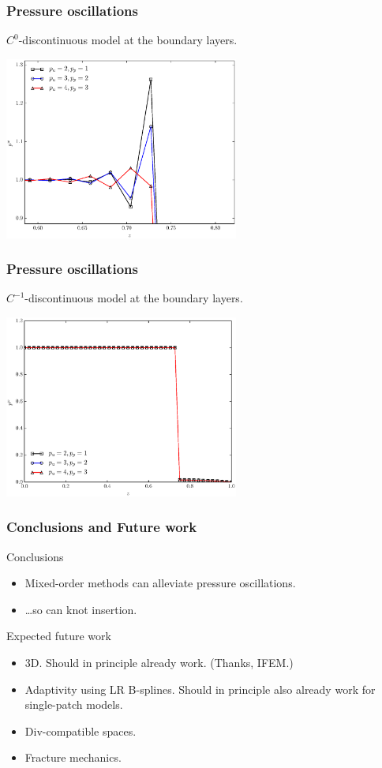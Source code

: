 \documentclass{beamer}
\begin{document}
\begin{frame}
  \frametitle{Pressure oscillations}

  $C^0$-discontinuous model at the boundary layers.
  \begin{center}
    \includegraphics[height=6cm]{figs/LowPermLayer_pw-z_plot6}
  \end{center}
\end{frame}

\begin{frame}
  \frametitle{Pressure oscillations}

  $C^{-1}$-discontinuous model at the boundary layers.
  \begin{center}
    \includegraphics[height=6cm]{figs/LowPermLayer_pw-z_plot8}
  \end{center}
\end{frame}

\begin{frame}
  \frametitle{Conclusions and Future work}

  Conclusions
  \begin{itemize}
  \item Mixed-order methods can alleviate pressure oscillations.
  \item \ldots so can knot insertion.
  \end{itemize}

  Expected future work
  \begin{itemize}
  \item 3D. Should in principle already work. (Thanks, IFEM.)
  \item Adaptivity using LR B-splines. Should in principle also already work for
    single-patch models.
  \item Div-compatible spaces.
  \item Fracture mechanics.
  \end{itemize}
\end{frame}
\end{document}
